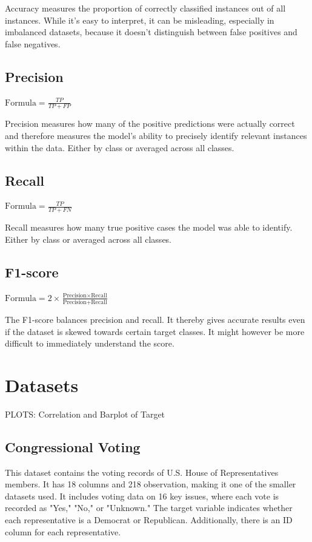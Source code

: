 \documentclass{article}
\begin{document}
Accuracy measures the proportion of correctly classified instances out of all instances. While it’s easy to interpret, it can be misleading, especially in imbalanced datasets, because it doesn't distinguish between false positives and false negatives.

\subsection{Precision}
$\text{Formula} = \frac{TP}{TP + FP}$

Precision measures how many of the positive predictions were actually correct and therefore measures the model’s ability to precisely identify relevant instances within the data. Either by class or averaged across all classes.

\subsection{Recall}
$\text{Formula} = \frac{TP}{TP + FN}$

Recall measures how many true positive cases the model was able to identify. Either by class or averaged
across all classes.

\subsection{F1-score}

$\text{Formula}  = 2 \times \frac{\text{Precision} \times \text{Recall}}{\text{Precision} + \text{Recall}}$

The F1-score balances precision and recall. It thereby gives accurate results even if the dataset is skewed towards certain target classes. It might however be more difficult to immediately understand the score.

\section{Datasets}
PLOTS: Correlation and Barplot of Target

\subsection{Congressional Voting}
This dataset contains the voting records of U.S. House of Representatives members. It has 18 columns and 218 observation, making it one of the smaller datasets used. It includes voting data on 16 key issues, where each vote is recorded as "Yes," "No," or "Unknown." The target variable indicates whether each representative is a Democrat or Republican. Additionally, there is an ID column for each representative.
\end{document}
